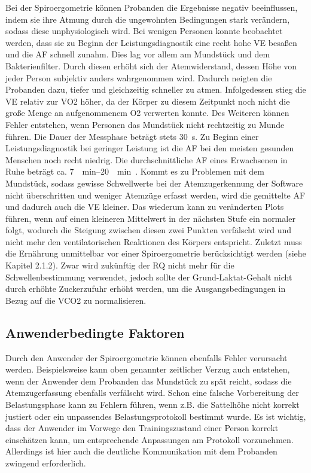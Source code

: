 Bei der Spiroergometrie können Probanden die Ergebnisse negativ beeinflussen, indem sie ihre Atmung durch die ungewohnten Bedingungen stark verändern, sodass diese unphysiologisch wird. Bei wenigen Personen konnte beobachtet werden, dass sie zu Beginn der Leistungsdiagnostik eine recht hohe \acs{VE} besaßen und die \acs{AF} schnell zunahm. Dies lag vor allem am Mundstück und dem Bakterienfilter. Durch diesen erhöht sich der Atemwiderstand, dessen Höhe von jeder Person subjektiv anders wahrgenommen wird. Dadurch neigten die Probanden dazu, tiefer und gleichzeitig schneller zu atmen. Infolgedessen stieg die \acs{VE} relativ zur \acs{VO2} höher, da der Körper zu diesem Zeitpunkt noch nicht die große Menge an aufgenommenem \acs{O2} verwerten konnte. Des Weiteren können Fehler entstehen, wenn Personen das Mundstück nicht rechtzeitig zu Munde führen. Die Dauer der Messphase beträgt stets \SI{30}{\second}. Zu Beginn einer Leistungsdiagnostik bei geringer Leistung ist die \acs{AF} bei den meisten gesunden Menschen noch recht niedrig. Die durchschnittliche \acs{AF} eines Erwachsenen in Ruhe beträgt ca. \SIrange{7}{20}{\per\minute}~\cite{Larsen.2017}. Kommt es zu Problemen mit dem Mundstück, sodass gewisse Schwellwerte bei der Atemzugerkennung der Software nicht überschritten und weniger Atemzüge erfasst werden, wird die gemittelte \acs{AF} und dadurch auch die \acs{VE} kleiner. Das wiederum kann zu veränderten Plots führen, wenn auf einen kleineren Mittelwert in der nächsten Stufe ein normaler folgt, wodurch die Steigung zwischen diesen zwei Punkten verfälscht wird und nicht mehr den ventilatorischen Reaktionen des Körpers entspricht. Zuletzt muss die Ernährung unmittelbar vor einer Spiroergometrie berücksichtigt werden (siehe Kapitel 2.1.2). Zwar wird zukünftig der RQ nicht mehr für die Schwellenbestimmung verwendet, jedoch sollte der Grund-Laktat-Gehalt nicht durch erhöhte Zuckerzufuhr erhöht werden, um die Ausgangsbedingungen in Bezug auf die \acs{VCO2} zu normalisieren.

\subsection{Anwenderbedingte Faktoren}

Durch den Anwender der Spiroergometrie können ebenfalls Fehler verursacht werden. Beispielsweise kann oben genannter zeitlicher Verzug auch entstehen, wenn der Anwender dem Probanden das Mundstück zu spät reicht, sodass die Atemzugerfassung ebenfalls verfälscht wird. Schon eine falsche Vorbereitung der Belastungsphase kann zu Fehlern führen, wenn z.B. die Sattelhöhe nicht korrekt justiert oder ein unpassendes Belastungsprotokoll bestimmt wurde. Es ist wichtig, dass der Anwender im Vorwege den Trainingszustand einer Person korrekt einschätzen kann, um entsprechende Anpassungen am Protokoll vorzunehmen. Allerdings ist hier auch die deutliche Kommunikation mit dem Probanden zwingend erforderlich.

